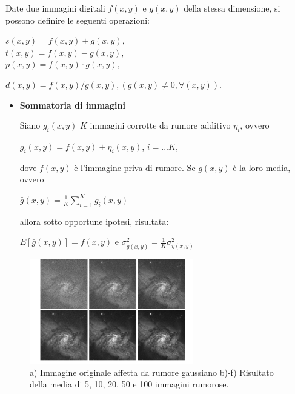 Date due immagini digitali $f(x,y)$ e $g(x,y)$ della stessa dimensione, si possono definire le seguenti operazioni:

\begin{center}
    $s(x,y) = f(x,y) + g(x,y),$
    \\$t(x,y) = f(x,y)-g(x,y),$
        \\$p(x,y)=f(x,y)·g(x,y),$
\end{center}
$d(x,y) = f(x,y)/g(x,y), (g(x,y) \neq 0, \forall(x,y)).$

\begin{itemize}
    \item \textbf{Sommatoria di immagini}

          Siano $g_i(x,y)$ $K$ immagini corrotte da rumore additivo $\eta_i$,
          ovvero
          \begin{center}
              $g_i(x,y) = f(x,y) + \eta_i(x,y)$, $i=...K,$
          \end{center}
          dove $f(x,y)$ è l'immagine priva di rumore. Se $g(x,y)$ è la loro media, ovvero
          \begin{center}
              $\bar{g}(x,y)=\frac{1}{K} \sum_{i=1}^{K}g_i(x,y)$
          \end{center}
          allora sotto opportune ipotesi, risultata:
          \begin{center}
              $E[\bar{g}(x,y)] = f(x,y)$ e $\sigma^2_{\bar{g}(x,y)}=\frac{1}{K}\sigma^2_{\eta(x,y)}$
          \end{center}
\end{itemize}

\begin{figure}[H]
    \centering
    \includegraphics[width=\linewidth, keepaspectratio]{capitoli/immagini/imgs/sommatoria-immagini.png}
    \caption*{a) Immagine originale affetta da rumore gaussiano
        b)-f) Risultato della media di 5, 10, 20, 50 e 100 immagini
        rumorose.}
\end{figure}

